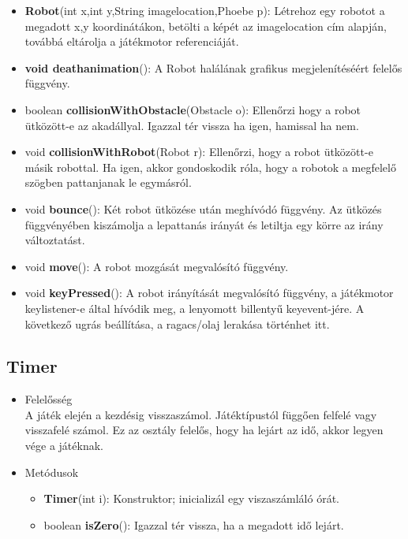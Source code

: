 \begin{itemize}
	\begin{itemize}
		\item \textbf{Robot}(int x,int y,String imagelocation,Phoebe p): Létrehoz egy robotot a megadott x,y koordinátákon, betölti a képét az imagelocation cím alapján, továbbá eltárolja a játékmotor referenciáját.
		\item \textbf{void deathanimation}(): A Robot halálának grafikus megjelenítéséért felelős függvény.
		\item boolean \textbf{collisionWithObstacle}(Obstacle o): Ellenőrzi hogy a robot ütközött-e az akadállyal. Igazzal tér vissza ha igen, hamissal ha nem.
		\item void \textbf{collisionWithRobot}(Robot r): Ellenőrzi, hogy a robot ütközött-e másik robottal. Ha igen, akkor gondoskodik róla, hogy a robotok a megfelelő szögben pattanjanak le egymásról.
		\item void \textbf{bounce}(): Két robot ütközése után meghívódó függvény. Az ütközés függvényében kiszámolja a lepattanás irányát és letiltja egy körre az irány változtatást.
		\item void \textbf{move}(): A robot mozgását megvalósító függvény.
		\item void \textbf{keyPressed}(): A robot irányítását megvalósító függvény, a játékmotor keylistener-e által hívódik meg, a lenyomott billentyű keyevent-jére. A következő ugrás beállítása, a ragacs/olaj lerakása történhet itt.
	\end{itemize}
\end{itemize}

\subsection{Timer}
\begin{itemize}
\item Felelősség\\
A játék elején a kezdésig visszaszámol. Játéktípustól függően felfelé vagy visszafelé számol. Ez az osztály felelős, hogy ha lejárt az idő, akkor legyen vége a játéknak.
\item Metódusok
	\begin{itemize}
		\item \textbf{Timer}(int i): Konstruktor; inicializál egy viszaszámláló órát.
		\item boolean \textbf{isZero}(): Igazzal tér vissza, ha a megadott idő lejárt.
	\end{itemize}
\end{itemize}

